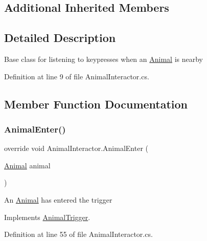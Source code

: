 \subsection*{Additional Inherited Members}


\subsection{Detailed Description}
Base class for listening to keypresses when an \mbox{\hyperlink{class_animal}{Animal}} is nearby 



Definition at line 9 of file Animal\+Interactor.\+cs.



\subsection{Member Function Documentation}
\mbox{\label{class_animal_interactor_a91ee9e749597002a9d8b48055f3ee0ce}} 
\subsubsection{\texorpdfstring{Animal\+Enter()}{AnimalEnter()}}
{\footnotesize\ttfamily override void Animal\+Interactor.\+Animal\+Enter (\begin{DoxyParamCaption}\item[{\mbox{\hyperlink{class_animal}{Animal}}}]{animal }\end{DoxyParamCaption})\hspace{0.3cm}{\ttfamily [virtual]}}



An \mbox{\hyperlink{class_animal}{Animal}} has entered the trigger 



Implements \mbox{\hyperlink{class_animal_trigger_a03181803fa268e0bfcbdc752ee733c40}{Animal\+Trigger}}.



Definition at line 55 of file Animal\+Interactor.\+cs.

\mbox{\label{class_animal_interactor_a0ff1e2c10b462d19357913cbf1f2d023}} 
